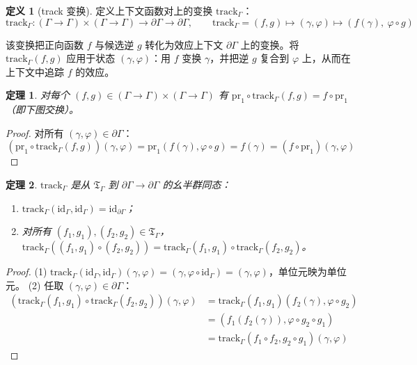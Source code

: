 \documentclass[11pt,a4paper]{article}
\theoremstyle{plain}
\newtheorem{theorem}{定理}
\theoremstyle{definition}
\newtheorem{definition}{定义}
\theoremstyle{remark}
\begin{document}
\begin{definition}[track 变换]
定义上下文函数对上的变换 $\mathrm{track}_\Gamma$：
\[
\mathrm{track}_\Gamma : (\Gamma \to \Gamma) \times (\Gamma \to \Gamma) \to \partial\Gamma \to \partial\Gamma, \qquad
\mathrm{track}_\Gamma = (f, g) \mapsto (\gamma, \varphi) \mapsto (f(\gamma),\ \varphi \circ g) \tag{6}
\]
\end{definition}

该变换把正向函数 $f$ 与候选逆 $g$ 转化为效应上下文 $\partial\Gamma$ 上的变换。将 $\mathrm{track}_\Gamma(f, g)$ 应用于状态 $(\gamma, \varphi)$：用 $f$ 变换 $\gamma$，并把逆 $g$ 复合到 $\varphi$ 上，从而在上下文中追踪 $f$ 的效应。

\begin{theorem}\label{thm:track-commute}
对每个 $(f, g) \in (\Gamma \to \Gamma) \times (\Gamma \to \Gamma)$ 有 $\mathrm{pr}_1 \circ \mathrm{track}_\Gamma(f, g) = f \circ \mathrm{pr}_1$（即下图交换）。
\end{theorem}

\begin{proof}
对所有 $(\gamma, \varphi) \in \partial\Gamma$：
\[
(\mathrm{pr}_1 \circ \mathrm{track}_\Gamma(f, g))(\gamma, \varphi) = \mathrm{pr}_1(f(\gamma), \varphi \circ g) = f(\gamma) = (f \circ \mathrm{pr}_1)(\gamma, \varphi)
\]
\end{proof}

\begin{theorem}\label{thm:track-hom}
$\mathrm{track}_\Gamma$ 是从 $\mathfrak{T}_\Gamma$ 到 $\partial\Gamma \to \partial\Gamma$ 的幺半群同态：
\begin{enumerate}
\item $\mathrm{track}_\Gamma(\mathrm{id}_\Gamma, \mathrm{id}_\Gamma) = \mathrm{id}_{\partial\Gamma}$；
\item 对所有 $(f_1, g_1), (f_2, g_2) \in \mathfrak{T}_\Gamma$，
$\mathrm{track}_\Gamma((f_1, g_1) \circ (f_2, g_2)) = \mathrm{track}_\Gamma(f_1, g_1) \circ \mathrm{track}_\Gamma(f_2, g_2)$。
\end{enumerate}
\end{theorem}

\begin{proof}
(1) $\mathrm{track}_\Gamma(\mathrm{id}_\Gamma, \mathrm{id}_\Gamma)(\gamma, \varphi) = (\gamma, \varphi \circ \mathrm{id}_\Gamma) = (\gamma, \varphi)$，单位元映为单位元。
(2) 任取 $(\gamma, \varphi) \in \partial\Gamma$：
\begin{align*}
(\mathrm{track}_\Gamma(f_1, g_1) \circ \mathrm{track}_\Gamma(f_2, g_2))(\gamma, \varphi)
&= \mathrm{track}_\Gamma(f_1, g_1)(f_2(\gamma), \varphi \circ g_2) \\
&= (f_1(f_2(\gamma)), \varphi \circ g_2 \circ g_1) \\
&= \mathrm{track}_\Gamma(f_1 \circ f_2, g_2 \circ g_1)(\gamma, \varphi)
\end{align*}
\end{proof}
\end{document}
